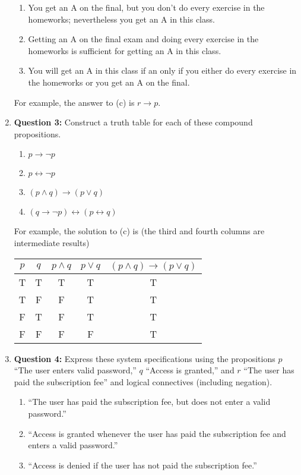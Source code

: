 \documentclass[11pt]{article}
\begin{document}
\begin{enumerate}
\begin{enumerate}[label=(\alph*)]
\item You get an A on the final, but you don't do every exercise in the homeworks;
nevertheless you get an A in this class.
\item Getting an A on the final exam and doing every exercise in the homeworks is
sufficient for getting an A in this class.
\item You will get an A in this class if an only if you either do every exercise in
the homeworks or you get an A on the final.
\end{enumerate}
For example, the answer to (c) is $r \rightarrow p$.
\item
\textbf{Question 3:}
Construct a truth table for each of these compound propositions.
\begin{enumerate}[label=(\alph*)]
\item $p \rightarrow \lnot p$
\item $p \leftrightarrow \lnot p$
\item $(p \land q) \rightarrow (p \lor q)$
\item $(q \rightarrow \lnot p) \leftrightarrow (p \leftrightarrow q)$
\end{enumerate}
For example, the solution to (c) is (the third and fourth columns are intermediate
results)
\begin{center}
\begin{tabular}{|c|c|c|c|c|}
\hline
$p$ & $q$ & $p \land q$ & $p \lor q$ & $(p \land q) \rightarrow (p \lor q)$\\
\hline
T & T & T & T & T\\
T & F & F & T & T\\
F & T & F & T & T\\
F & F & F & F & T\\
\hline
\end{tabular}
\end{center}
\item
\textbf{Question 4:}
Express these system specifications using the propositions $p$ ``The user enters
valid password,'' $q$ ``Access is granted,'' and $r$ ``The user has paid the
subscription fee'' and logical connectives (including negation).
\begin{enumerate}[label=(\alph*)]
\item ``The user has paid the subscription fee, but does not enter a valid
password.''
\item ``Access is granted whenever the user has paid the subscription fee and
enters a valid password.''
\item ``Access is denied if the user has not paid the subscription fee.''

\end{enumerate}
\end{enumerate}
\end{document}
